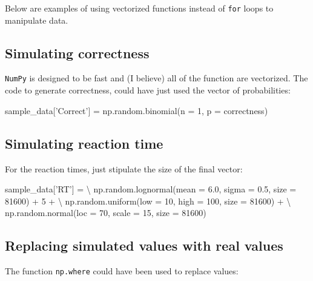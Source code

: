 \documentclass[]{article}
\newenvironment{Shaded}{\begin{snugshade}}{\end{snugshade}}
\newcommand{\DecValTok}[1]{\textcolor[rgb]{0.00,0.00,0.81}{{#1}}}
\newcommand{\FloatTok}[1]{\textcolor[rgb]{0.00,0.00,0.81}{{#1}}}
\newcommand{\StringTok}[1]{\textcolor[rgb]{0.31,0.60,0.02}{{#1}}}
\newcommand{\NormalTok}[1]{{#1}}
\begin{document}
Below are examples of using vectorized functions instead of \texttt{for}
loops to manipulate data.

\subsection{Simulating correctness}\label{simulating-correctness}

\texttt{NumPy} is designed to be fast and (I believe) all of the
function are vectorized. The code to generate correctness, could have
just used the vector of probabilities:

\begin{Shaded}
\begin{Highlighting}[]
\NormalTok{sample_data[}\StringTok{'Correct'}\NormalTok{] = np.random.binomial(n = }\DecValTok{1}\NormalTok{, p = correctness)}
\end{Highlighting}
\end{Shaded}

\subsection{Simulating reaction time}\label{simulating-reaction-time}

For the reaction times, just stipulate the size of the final vector:

\begin{Shaded}
\begin{Highlighting}[]
\NormalTok{sample_data[}\StringTok{'RT'}\NormalTok{] = \textbackslash{}}
  \NormalTok{np.random.lognormal(mean = }\FloatTok{6.0}\NormalTok{, sigma = }\FloatTok{0.5}\NormalTok{, size = }\DecValTok{81600}\NormalTok{) + }\DecValTok{5} \NormalTok{+ \textbackslash{}}
      \NormalTok{np.random.uniform(low = }\DecValTok{10}\NormalTok{, high = }\DecValTok{100}\NormalTok{, size = }\DecValTok{81600}\NormalTok{) + \textbackslash{}}
      \NormalTok{np.random.normal(loc = }\DecValTok{70}\NormalTok{, scale = }\DecValTok{15}\NormalTok{, size = }\DecValTok{81600}\NormalTok{)}
\end{Highlighting}
\end{Shaded}

\subsection{Replacing simulated values with real
values}\label{replacing-simulated-values-with-real-values}

The function \texttt{np.where} could have been used to replace values:
\end{document}
